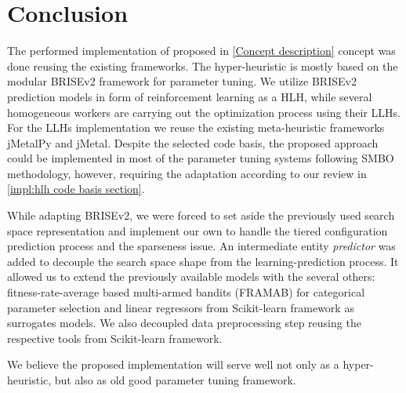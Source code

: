 \section{Conclusion}
The performed implementation of proposed in \cref{Concept description} concept was done reusing the existing frameworks. The hyper-heuristic is mostly based on the modular BRISEv2 framework for parameter tuning. We utilize BRISEv2 prediction models in form of reinforcement learning as a HLH, while several homogeneous workers are carrying out the optimization process using their LLHs. For the LLHs implementation we reuse the existing meta-heuristic frameworks jMetalPy and jMetal. Despite the selected code basis, the proposed approach could be implemented in most of the parameter tuning systems following SMBO methodology, however, requiring the adaptation according to our review in \cref{impl:hlh code basis section}.

While adapting BRISEv2, we were forced to set aside the previously used search space representation and implement our own to handle the tiered configuration prediction process and the sparseness issue. An intermediate entity \emph{predictor} was added to decouple the search space shape from the learning-prediction process. It allowed us to extend the previously available models with the several others: fitness-rate-average based multi-armed bandits (FRAMAB) for categorical parameter selection and linear regressors from Scikit-learn framework as surrogates models. We also decoupled data preprocessing step reusing the respective tools from Scikit-learn framework.

We believe the proposed implementation will serve well not only as a hyper-heuristic, but also as old good parameter tuning framework.